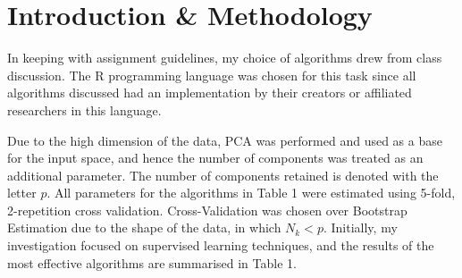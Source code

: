 \documentclass[conference,final,]{IEEEtran}
\begin{document}

%
\IEEEpeerreviewmaketitle


\hypertarget{introduction-methodology}{%
\section{Introduction \& Methodology}\label{introduction-methodology}}

In keeping with assignment guidelines, my choice of algorithms drew from
class discussion. The R programming language was chosen for this task
since all algorithms discussed had an implementation by their creators
or affiliated researchers in this language.

Due to the high dimension of the data, PCA was performed and used as a
base for the input space, and hence the number of components was treated
as an additional parameter. The number of components retained is denoted
with the letter \(p\). All parameters for the algorithms in Table 1 were
estimated using 5-fold, 2-repetition cross validation. Cross-Validation
was chosen over Bootstrap Estimation due to the shape of the data, in
which \(N_k<p\). Initially, my investigation focused on supervised
learning techniques, and the results of the most effective algorithms
are summarised in Table 1.
\end{document}
